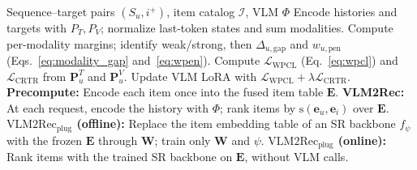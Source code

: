 \begin{algorithm}[!h]
\caption{Training and inference of VLM2Rec and $\text{VLM2Rec}_{\text{plug}}$}
\label{alg:vlm2rec_pipeline}
\small
\begin{algorithmic}[1]
\Require Sequence--target pairs $(S_u,i^+)$, item catalog $\mathcal I$, VLM $\Phi$
    \State Encode histories and targets with $P_T,P_V$; normalize last-token states and sum modalities.
    \State Compute per-modality margins; identify weak/strong, then $\Delta_{u,\mathrm{gap}}$ and $w_{u,\text{pen}}$ (Eqs.~\ref{eq:modality_gap} and~\ref{eq:wpen}).
    \State Compute $\mathcal L_{\text{WPCL}}$ (Eq.~\ref{eq:wpcl}) and $\mathcal L_{\text{CRTR}}$ from $\mathbf P_u^T$ and $\mathbf P_u^V$.
    \State Update VLM LoRA with $\mathcal L_{\text{WPCL}}+\lambda\mathcal L_{\text{CRTR}}$.
\EndFor
\State \textbf{Precompute:} Encode each item once into the fused item table $\mathbf E$.
\State \textbf{VLM2Rec:} At each request, encode the history with $\Phi$; rank items by $\text{s}(\mathbf e_u,\mathbf e_i)$ over $\mathbf E$.
\State \textbf{$\text{VLM2Rec}_{\text{plug}}$ (offline):} Replace the item embedding table of an SR backbone $f_\psi$ with the frozen $\mathbf E$ through $\mathbf W$; train only $\mathbf W$ and $\psi$.
\State \textbf{$\text{VLM2Rec}_{\text{plug}}$ (online):} Rank items with the trained SR backbone on $\mathbf E$, without VLM calls.
\end{algorithmic}
\end{algorithm}



